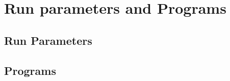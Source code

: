 \chapter{Run parameters and Programs}
\label{ch:programs}

\section{Run Parameters}


\section{Programs}

